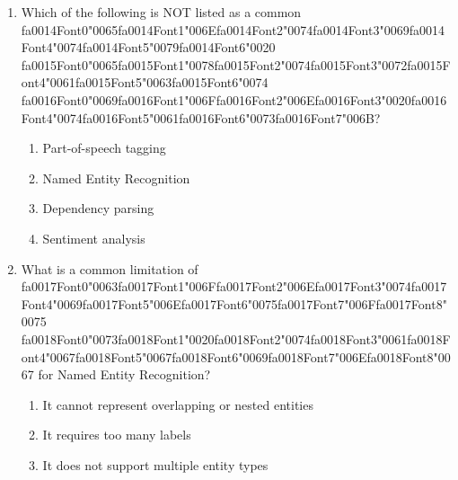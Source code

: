 \documentclass[12pt]{article}
\begin{document}
\begin{enumerate}[label=Q\arabic*.]
\item Which of the following is NOT listed as a common {\csname fa0014Font0\endcsname\char"0065}{\csname fa0014Font1\endcsname\char"006E}{\csname fa0014Font2\endcsname\char"0074}{\csname fa0014Font3\endcsname\char"0069}{\csname fa0014Font4\endcsname\char"0074}{\csname fa0014Font5\endcsname\char"0079}{\csname fa0014Font6\endcsname\char"0020} {\csname fa0015Font0\endcsname\char"0065}{\csname fa0015Font1\endcsname\char"0078}{\csname fa0015Font2\endcsname\char"0074}{\csname fa0015Font3\endcsname\char"0072}{\csname fa0015Font4\endcsname\char"0061}{\csname fa0015Font5\endcsname\char"0063}{\csname fa0015Font6\endcsname\char"0074} {\csname fa0016Font0\endcsname\char"0069}{\csname fa0016Font1\endcsname\char"006F}{\csname fa0016Font2\endcsname\char"006E}{\csname fa0016Font3\endcsname\char"0020}{\csname fa0016Font4\endcsname\char"0074}{\csname fa0016Font5\endcsname\char"0061}{\csname fa0016Font6\endcsname\char"0073}{\csname fa0016Font7\endcsname\char"006B}?
\begin{enumerate}[label=(\Alph*)]
    \item Part-of-speech tagging
    \item Named Entity Recognition
    \item Dependency parsing
    \item Sentiment analysis
\end{enumerate}
\item What is a common limitation of {\csname fa0017Font0\endcsname\char"0063}{\csname fa0017Font1\endcsname\char"006F}{\csname fa0017Font2\endcsname\char"006E}{\csname fa0017Font3\endcsname\char"0074}{\csname fa0017Font4\endcsname\char"0069}{\csname fa0017Font5\endcsname\char"006E}{\csname fa0017Font6\endcsname\char"0075}{\csname fa0017Font7\endcsname\char"006F}{\csname fa0017Font8\endcsname\char"0075} {\csname fa0018Font0\endcsname\char"0073}{\csname fa0018Font1\endcsname\char"0020}{\csname fa0018Font2\endcsname\char"0074}{\csname fa0018Font3\endcsname\char"0061}{\csname fa0018Font4\endcsname\char"0067}{\csname fa0018Font5\endcsname\char"0067}{\csname fa0018Font6\endcsname\char"0069}{\csname fa0018Font7\endcsname\char"006E}{\csname fa0018Font8\endcsname\char"0067} for Named Entity Recognition?
\begin{enumerate}[label=(\Alph*)]
    \item It cannot represent overlapping or nested entities
    \item It requires too many labels
    \item It does not support multiple entity types

\end{enumerate}
\end{enumerate}
\end{document}
